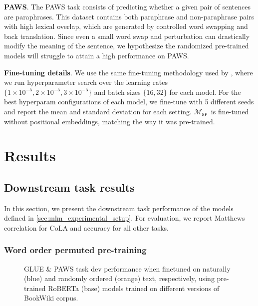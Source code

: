 \documentclass[letterpaper, 12pt]{report}
\newcommand{\xhdr}[1]{{\noindent\bfseries #1}.}
\newcommand{\NP}{$\mathcal{M}_{\texttt{NP}}$}
\begin{document}
\xhdr{PAWS} The PAWS task \citep{zhang-etal-2019-paws} consists of predicting whether a given pair of sentences are paraphrases. This dataset contains both paraphrase and non-paraphrase pairs with high lexical overlap, which are generated by controlled word swapping and back translation. Since even a small word swap and perturbation can drastically modify the meaning of the sentence, we hypothesize the randomized pre-trained models will struggle to attain a high performance on PAWS.

\xhdr{Fine-tuning details} We use the same fine-tuning methodology used by \citet{liu-et-al-2019-roberta}, where we run hyperparameter search over the learning rates $\{1 \times 10^{-5}, 2 \times 10^{-5}, 3 \times 10^{-5}\}$ and batch sizes $\{16, 32\}$ for each model.
For the best hyperparam configurations of each model, we fine-tune with 5 different seeds and report the mean and standard deviation for each setting. %
\NP\ is fine-tuned without positional embeddings, matching the way it was pre-trained.

\section{Results}
\label{sec:mlm_results}

\subsection{Downstream task results}
\label{sec:mlm_downstream_results}


In this section, we present the downstream task performance of the models defined in \autoref{sec:mlm_experimental_setup}. For evaluation, we report Matthews correlation for CoLA and accuracy for all other tasks.

\subsubsection{Word order permuted pre-training}
\label{sec:mlm_glue_results}



\begin{figure}[ht]
    \centering
    \caption{GLUE \& PAWS task dev performance when finetuned on naturally (blue) and randomly ordered (orange) text, respectively, using pre-trained RoBERTa (base) models trained on different versions of BookWiki corpus.}
    \label{fig:mlm_word_order_glue}
\end{figure}
\end{document}
